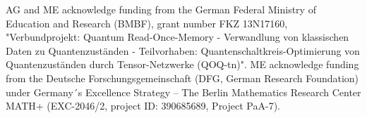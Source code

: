 AG and ME acknowledge funding from the German Federal Ministry of Education and Research (BMBF), grant number FKZ 13N17160, "Verbundprojekt: Quantum Read-Once-Memory - Verwandlung von klassischen Daten zu Quantenzuständen - Teilvorhaben: Quanten{\allowbreak}schaltkreis-Optimierung von Quantenzuständen durch Tensor-Netzwerke (QOQ-tn)".
ME acknowledge funding from the Deutsche Forschungsgemeinschaft (DFG, German Research Foundation) under Germany´s Excellence Strategy – The Berlin Mathematics Research Center MATH+ (EXC-2046/2, project ID: 390685689, Project PaA-7).